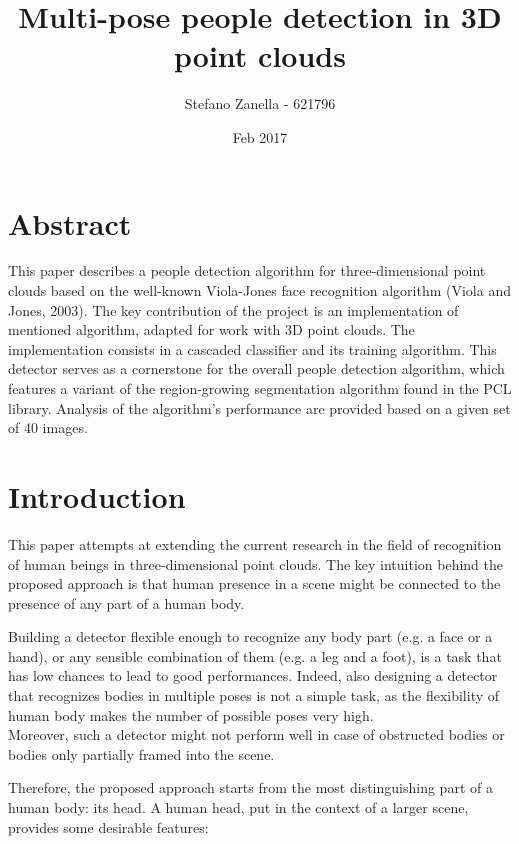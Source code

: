 \documentclass[a4paper,12pt,titlepage]{article}
\begin{document}
\title{Multi-pose people detection in 3D point clouds}
\author{Stefano Zanella - 621796}
\date{Feb 2017}

\maketitle

\section{Abstract}
This paper describes a people detection algorithm for three-dimensional point
clouds based on the well-known Viola-Jones face recognition algorithm (Viola and
Jones, 2003). The key contribution of the project is an implementation of
mentioned algorithm, adapted for work with 3D point clouds. The implementation
consists in a cascaded classifier and its training algorithm. This detector
serves as a cornerstone for the overall people detection algorithm, which
features a variant of the region-growing segmentation algorithm found in the PCL
library. Analysis of the algorithm's performance are provided based on a
given set of 40 images.

\newpage

\section{Introduction}
This paper attempts at extending the current research in the field of
recognition of human beings in three-dimensional point clouds. The key intuition
behind the proposed approach is that human presence in a scene might be
connected to the presence of any part of a human body.

Building a detector flexible enough to recognize any body part (e.g. a face or a
hand), or any sensible combination of them (e.g. a leg and a foot), is a task
that has low chances to lead to good performances. Indeed, also designing a
detector that recognizes bodies in multiple poses is not a simple task, as the
flexibility of human body makes the number of possible poses very high. \\
Moreover, such a detector might not perform well in case of obstructed bodies or
bodies only partially framed into the scene.

Therefore, the proposed approach starts from the most distinguishing part of
a human body: its head. A human head, put in the context of a larger scene,
provides some desirable features:
\end{document}
